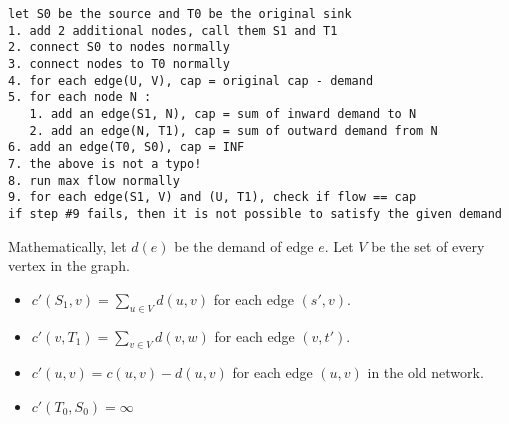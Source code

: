 \begin{lstlisting}
let S0 be the source and T0 be the original sink
1. add 2 additional nodes, call them S1 and T1
2. connect S0 to nodes normally
3. connect nodes to T0 normally
4. for each edge(U, V), cap = original cap - demand
5. for each node N :
   1. add an edge(S1, N), cap = sum of inward demand to N
   2. add an edge(N, T1), cap = sum of outward demand from N
6. add an edge(T0, S0), cap = INF
7. the above is not a typo!
8. run max flow normally
9. for each edge(S1, V) and (U, T1), check if flow == cap
if step #9 fails, then it is not possible to satisfy the given demand
\end{lstlisting}
\par\noindent Mathematically, let $d(e)$ be the demand of edge $e$. Let $V$ be the set of every vertex in the graph.
\begin{itemize}
    \item $c'(S_1,v) = \sum_{u\in{V}} d(u,v)$ for each edge $(s',v)$.
    \item $c'(v,T_1) = \sum_{v\in{V}} d(v,w)$ for each edge $(v,t')$.
    \item $c'(u,v) = c(u,v) - d(u,v)$ for each edge $(u,v)$ in the old network.
    \item $c'(T_0,S_0) = \infty$
\end{itemize}
